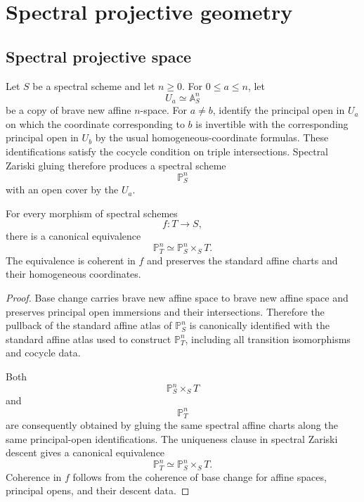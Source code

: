 \section{Spectral projective geometry}
\label{sec:spectral-projective-geometry}

\subsection{Spectral projective space}

\begin{construction}
\label{constr:spectral-projective-space}
Let \(S\) be a spectral scheme and let \(n\geq0\).  For
\(0\leq a\leq n\), let
\[
    U_a
    \simeq
    \mathbb A^n_S
\]
be a copy of brave new affine \(n\)-space.  For \(a\neq b\), identify the
principal open in \(U_a\) on which the coordinate corresponding to \(b\) is
invertible with the corresponding principal open in \(U_b\) by the usual
homogeneous-coordinate formulas.  These identifications satisfy the cocycle
condition on triple intersections.  Spectral Zariski gluing therefore
produces a spectral scheme
\[
    \mathbb P^n_S
\]
with an open cover by the \(U_a\).
\end{construction}

\begin{proposition}
\label{prop:projective-space-base-change}
For every morphism of spectral schemes
\[
    f:T\longrightarrow S,
\]
there is a canonical equivalence
\[
    \mathbb P^n_T
    \simeq
    \mathbb P^n_S\times_ST.
\]
The equivalence is coherent in \(f\) and preserves the standard affine
charts and their homogeneous coordinates.
\end{proposition}

\begin{proof}
Base change carries brave new affine space to brave new affine space and
preserves principal open immersions and their intersections.  Therefore the
pullback of the standard affine atlas of
\(\mathbb P^n_S\) is canonically identified with the standard affine atlas
used to construct \(\mathbb P^n_T\), including all transition
isomorphisms and cocycle data.

Both
\[
    \mathbb P^n_S\times_ST
\]
and
\[
    \mathbb P^n_T
\]
are consequently obtained by gluing the same spectral affine charts along
the same principal-open identifications.  The uniqueness clause in spectral
Zariski descent gives a canonical equivalence
\[
    \mathbb P^n_T
    \simeq
    \mathbb P^n_S\times_ST.
\]
Coherence in \(f\) follows from the coherence of base change for affine
spaces, principal opens, and their descent data.
\end{proof}

